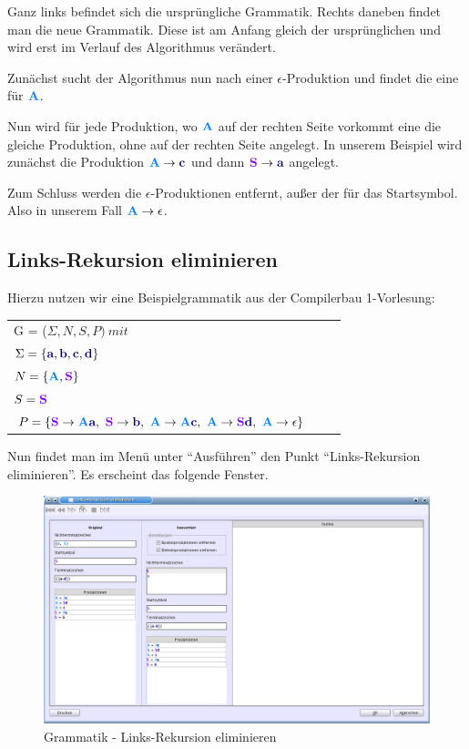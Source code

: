Ganz links befindet sich die ursprüngliche Grammatik. Rechts daneben findet man die neue Grammatik. Diese ist am Anfang gleich der ursprünglichen und wird erst im Verlauf des Algorithmus verändert.

Zunächst sucht der Algorithmus nun nach einer $\epsilon$-Produktion und findet die eine für $\NonterminalSymbol{A}$.

Nun wird für jede Produktion, wo $\NonterminalSymbol{A}$ auf der rechten Seite vorkommt eine die gleiche Produktion, ohne  auf der rechten Seite angelegt. In unserem Beispiel wird zunächst die Produktion $\NonterminalSymbol{A} \to \TerminalSymbol{c}$ und dann $\StartSymbol{S} \to \TerminalSymbol{a}$ angelegt.

Zum Schluss werden die $\epsilon$-Produktionen entfernt, außer der für das Startsymbol. Also in unserem Fall $\NonterminalSymbol{A} \to \epsilon$.


\subsection{Links-Rekursion eliminieren}

Hierzu nutzen wir eine Beispielgrammatik aus der Compilerbau 1-Vorlesung:

\begin{tabular}{lcr}
G = ($\Sigma, N, S, P )\ mit $\\
$\Sigma = \{\TerminalSymbol{a}, \TerminalSymbol{b}, \TerminalSymbol{c},
\TerminalSymbol{d}\}$\\ $N =
\{\NonterminalSymbol{A}, \StartSymbol{S}\}$\\ $S=\StartSymbol{S}$\\
$P = \{\StartSymbol{S} \to \NonterminalSymbol{A}\TerminalSymbol{a},\ \StartSymbol{S} \to \TerminalSymbol{b},\
\NonterminalSymbol{A}	\to \NonterminalSymbol{A}\TerminalSymbol{c},\ \NonterminalSymbol{A} \to \StartSymbol{S}\TerminalSymbol{d},\
\NonterminalSymbol{A} \to \epsilon\}$\\
\end{tabular}

Nun findet man im Menü unter "`Ausführen"' den Punkt "`Links-Rekursion eliminieren"'. Es erscheint das folgende Fenster.

\begin{figure}[h]
\begin{center}
\includegraphics[width=12cm]{../images/left_recursion.png}
\caption{Grammatik - Links-Rekursion eliminieren}
\end{center}
\end{figure}

